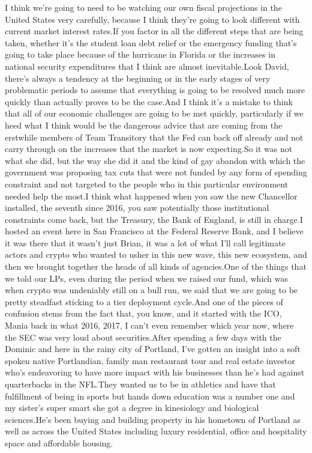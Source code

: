 \documentclass{article}%
\begin{document}
I think we're going to need to be watching our own fiscal projections in the United States very carefully, because I think they're going to look different with current market interest rates.If you factor in all the different steps that are being taken, whether it's the student loan debt relief or the emergency funding that's going to take place because of the hurricane in Florida or the increases in national security expenditures that I think are almost inevitable.Look David, there's always a tendency at the beginning or in the early stages of very problematic periods to assume that everything is going to be resolved much more quickly than actually proves to be the case.And I think it's a mistake to think that all of our economic challenges are going to be met quickly, particularly if we heed what I think would be the dangerous advice that are coming from the erstwhile members of Team Transitory that the Fed can back off already and not carry through on the increases that the market is now expecting.So it was not what she did, but the way she did it and the kind of gay abandon with which the government was proposing tax cuts that were not funded by any form of spending constraint and not targeted to the people who in this particular environment needed help the most.I think what happened when you saw the new Chancellor installed, the seventh since 2016, you saw potentially those institutional constraints come back, but the Treasury, the Bank of England, is still in charge.I hosted an event here in San Francisco at the Federal Reserve Bank, and I believe it was there that it wasn't just Brian, it was a lot of what I'll call legitimate actors and crypto who wanted to usher in this new wave, this new ecosystem, and then we brought together the heads of all kinds of agencies.One of the things that we told our LPs, even during the period when we raised our fund, which was when crypto was undeniably still on a bull run, we said that we are going to be pretty steadfast sticking to a tier deployment cycle.And one of the pieces of confusion stems from the fact that, you know, and it started with the ICO, Mania back in what 2016, 2017, I can't even remember which year now, where the SEC was very loud about securities.After spending a few days with the Dominic and here in the rainy city of Portland, I've gotten an insight into a soft spoken native Portlandian, family man restaurant tour and real estate investor who's endeavoring to have more impact with his businesses than he's had against quarterbacks in the NFL.They wanted us to be in athletics and have that fulfillment of being in sports but hands down education was a number one and my sister's super smart she got a degree in kinesiology and biological sciences.He's been buying and building property in his hometown of Portland as well as across the United States including luxury residential, office and hospitality space and affordable housing.%
\end{document}
